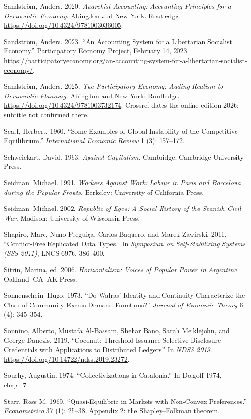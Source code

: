 \documentclass[10pt,twoside,openany]{book}
\theoremstyle{dpepstyle}
\begin{document}
\begin{list}{}{\setlength{\leftmargin}{1.8em}\setlength{\itemindent}{-1.8em}\setlength{\itemsep}{3pt}\setlength{\parsep}{0pt}}
\item Sandstr\"om, Anders. 2020. \emph{Anarchist Accounting: Accounting Principles for a Democratic Economy}. Abingdon and New York: Routledge. \url{https://doi.org/10.4324/9781003036005}.
\item Sandstr\"om, Anders. 2023. ``An Accounting System for a Libertarian Socialist Economy.'' Participatory Economy Project, February 14, 2023. \url{https://participatoryeconomy.org/an-accounting-system-for-a-libertarian-socialist-economy/}.
\item Sandstr\"om, Anders. 2025. \emph{The Participatory Economy: Adding Realism to Democratic Planning}. Abingdon and New York: Routledge. \url{https://doi.org/10.4324/9781003732174}. Crossref dates the online edition 2026; subtitle not confirmed there.
\item Scarf, Herbert. 1960. ``Some Examples of Global Instability of the Competitive Equilibrium.'' \emph{International Economic Review} 1 (3): 157--172.
\item Schweickart, David. 1993. \emph{Against Capitalism}. Cambridge: Cambridge University Press.
\item Seidman, Michael. 1991. \emph{Workers Against Work: Labour in Paris and Barcelona during the Popular Fronts}. Berkeley: University of California Press.
\item Seidman, Michael. 2002. \emph{Republic of Egos: A Social History of the Spanish Civil War}. Madison: University of Wisconsin Press.
\item Shapiro, Marc, Nuno Pregui\c{c}a, Carlos Baquero, and Marek Zawirski. 2011. ``Conflict-Free Replicated Data Types.'' In \emph{Symposium on Self-Stabilizing Systems (SSS 2011)}, LNCS 6976, 386--400.
\item Sitrin, Marina, ed. 2006. \emph{Horizontalism: Voices of Popular Power in Argentina}. Oakland, CA: AK Press.
\item Sonnenschein, Hugo. 1973. ``Do Walras' Identity and Continuity Characterize the Class of Community Excess Demand Functions?'' \emph{Journal of Economic Theory} 6 (4): 345--354.
\item Sonnino, Alberto, Mustafa Al-Bassam, Shehar Bano, Sarah Meiklejohn, and George Danezis. 2019. ``Coconut: Threshold Issuance Selective Disclosure Credentials with Applications to Distributed Ledgers.'' In \emph{NDSS 2019}. \url{https://doi.org/10.14722/ndss.2019.23272}.
\item Souchy, Augustin. 1974. ``Collectivizations in Catalonia.'' In Dolgoff 1974, chap.~7.
\item Starr, Ross M. 1969. ``Quasi-Equilibria in Markets with Non-Convex Preferences.'' \emph{Econometrica} 37 (1): 25--38. Appendix 2: the Shapley--Folkman theorem.

\end{list}
\end{document}

